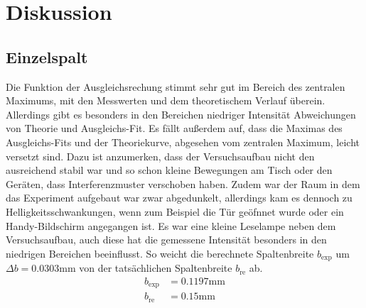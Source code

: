 \section{Diskussion}
\label{sec:Diskussion}

\subsection{Einzelspalt}
Die Funktion der Ausgleichsrechung stimmt sehr gut im Bereich des zentralen Maximums, mit den Messwerten und dem theoretischem Verlauf überein.
Allerdings gibt es besonders in den Bereichen niedriger Intensität Abweichungen von Theorie und Ausgleichs-Fit.
Es fällt außerdem auf, dass die Maximas des Ausgleichs-Fits und der Theoriekurve, abgesehen vom zentralen Maximum, leicht versetzt sind.
Dazu ist anzumerken, dass der Versuchsaufbau nicht den ausreichend stabil war und so schon kleine Bewegungen am Tisch oder den Geräten, dass Interferenzmuster verschoben haben.
Zudem war der Raum in dem das Experiment aufgebaut war zwar abgedunkelt, allerdings kam es dennoch zu Helligkeitsschwankungen, wenn zum Beispiel die Tür geöfnnet wurde oder ein Handy-Bildschirm angegangen ist.
Es war eine kleine Leselampe neben dem Versuchsaufbau, auch diese hat die gemessene Intensität besonders in den niedrigen Bereichen beeinflusst.
So weicht die berechnete Spaltenbreite $b_\text{exp}$ um $\Delta b = 0.0303\si{\milli\meter}$ von der tatsächlichen Spaltenbreite $b_\text{re}$ ab.
\begin{align*}
b_\text{exp} &= 0.1197 \si{\milli\meter}\\
b_\text{re} &= 0.15 \si{\milli\meter}
\end{align*}

